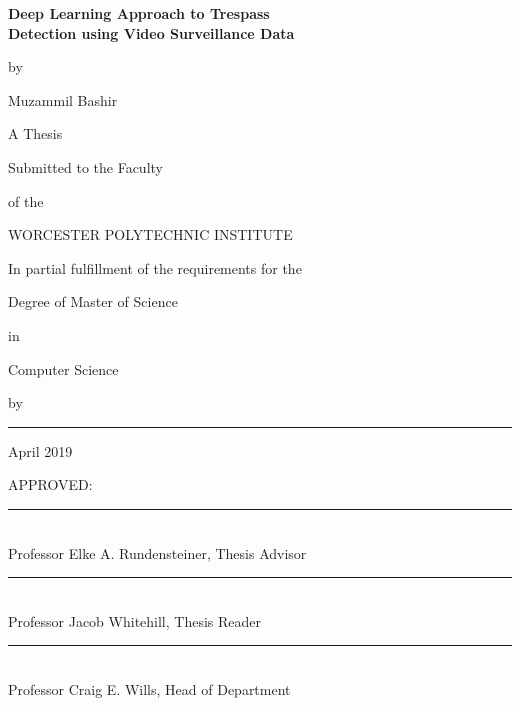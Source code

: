 \newcommand\x{13}

\onecolumn
\begin{center}
{ \LARGE
\textbf{Deep Learning Approach to Trespass   \\
\vspace{5pt}
Detection using Video Surveillance Data}
}

{ \normalsize
\vspace{\x pt}

by \vspace{\x pt}

Muzammil Bashir

\vspace{\x pt}

A Thesis 

\vspace{\x pt}

Submitted to the Faculty

\vspace{\x pt}

of the

\vspace{\x pt}

WORCESTER POLYTECHNIC INSTITUTE

\vspace{\x pt}

In partial fulfillment of the requirements for the

\vspace{\x pt}

Degree of Master of Science

\vspace{\x pt}

in

\vspace{\x pt}

Computer Science

\vspace{\x pt}

by

\vspace{\x pt}
\rule{0.6\textwidth}{1pt}

April 2019
}
\end{center}

{ \normalsize

\vspace{23 pt}
APPROVED:

\vspace{\x pt}
\rule{0.6\textwidth}{1pt} \\
Professor Elke A. Rundensteiner, Thesis Advisor

\vspace{\x pt}
\rule{0.6\textwidth}{1pt} \\
Professor Jacob Whitehill, Thesis Reader

\vspace{\x pt}
\rule{0.6\textwidth}{1pt} \\
Professor Craig E. Wills, Head of Department

}
\newpage \clearpage
